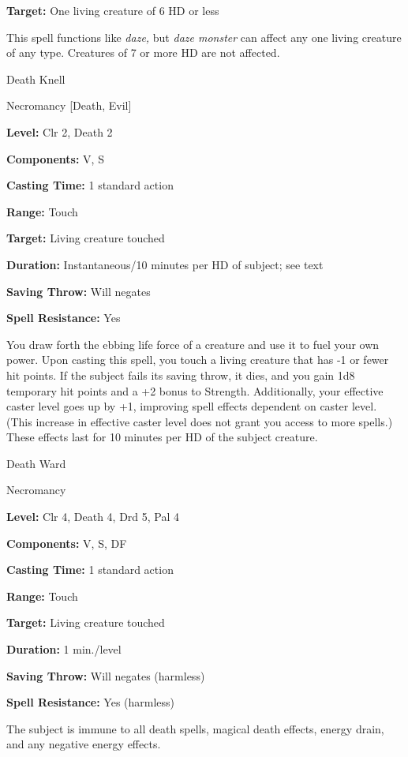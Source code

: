 \documentclass{article}
\begin{document}
\textbf{Target: }One living creature of 6 HD or less

This spell functions like \textit{daze, }but \textit{daze monster }can affect any 
one living creature of any type. Creatures of 7 or more HD are not affected.

\vspace{12pt}
Death Knell

Necromancy [Death, Evil]

\textbf{Level:} Clr 2, Death 2

\textbf{Components:} V, S

\textbf{Casting Time:} 1 standard action

\textbf{Range:} Touch

\textbf{Target:} Living creature touched

\textbf{Duration:} Instantaneous/10 minutes per HD of subject; see text

\textbf{Saving Throw: }Will negates

\textbf{Spell Resistance:} Yes

You draw forth the ebbing life force of a creature and use it to fuel your own 
power. Upon casting this spell, you touch a living creature that has -1 or fewer 
hit points. If the subject fails its saving throw, it dies, and you gain 1d8 temporary 
hit points and a +2 bonus to Strength. Additionally, your effective caster level 
goes up by +1, improving spell effects dependent on caster level. (This increase 
in effective caster level does not grant you access to more spells.) These effects 
last for 10 minutes per HD of the subject creature.

\vspace{12pt}
Death Ward

Necromancy

\textbf{Level:} Clr 4, Death 4, Drd 5, Pal 4

\textbf{Components:} V, S, DF

\textbf{Casting Time:} 1 standard action

\textbf{Range:} Touch

\textbf{Target:} Living creature touched

\textbf{Duration:} 1 min./level

\textbf{Saving Throw: }Will negates (harmless)

\textbf{Spell Resistance:} Yes (harmless)

The subject is immune to all death spells, magical death effects, energy drain, 
and any negative energy effects.
\end{document}
